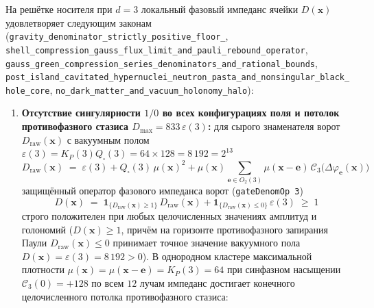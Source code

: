 \begin{theorem}
\label{thm:mono-gravity-pasta-halo}
На решётке носителя при $d = 3$ локальный фазовый импеданс ячейки $D(\mathbf{x})$ удовлетворяет следующим законам (\texttt{gravity\_\allowbreak denominator\_\allowbreak strictly\_\allowbreak positive\_\allowbreak floor\_}, \texttt{shell\_\allowbreak compression\_\allowbreak gauss\_\allowbreak flux\_\allowbreak limit\_\allowbreak and\_\allowbreak pauli\_\allowbreak rebound\_\allowbreak operator}, \texttt{gauss\_\allowbreak green\_\allowbreak compression\_\allowbreak series\_\allowbreak denominators\_\allowbreak and\_\allowbreak rational\_\allowbreak bounds}, \texttt{post\_\allowbreak island\_\allowbreak cavitated\_\allowbreak hypernuclei\_\allowbreak neutron\_\allowbreak pasta\_\allowbreak and\_\allowbreak nonsingular\_\allowbreak black\_\allowbreak hole\_\allowbreak core}, \texttt{no\_\allowbreak dark\_\allowbreak matter\_\allowbreak and\_\allowbreak vacuum\_\allowbreak holonomy\_\allowbreak halo}):
\begin{enumerate}[label=\textbf{(\arabic*)},leftmargin=*]
\item \textbf{Отсутствие сингулярности $1/0$ во всех конфигурациях поля и потолок противофазного стазиса $D_{\max} = 833\,\varepsilon(3)$:}
  для сырого знаменателя ворот $D_{\mathrm{raw}}(\mathbf{x})$ с вакуумным полом $\varepsilon(3) = K_P(3) Q_\square(3) = 64 \times 128 = 8\,192 = 2^{13}$
  \begin{equation}
    \label{eq:mono-gravity-denom-raw}
    D_{\mathrm{raw}}(\mathbf{x}) \;=\; \varepsilon(3) + Q_\square(3)\,\mu(\mathbf{x})^2 + \mu(\mathbf{x}) \sum_{\mathbf{e} \in O_2(3)} \mu(\mathbf{x}-\mathbf{e})\,\mathcal{C}_3\bigl(\Delta\varphi_{\mathbf{e}}(\mathbf{x})\bigr)
  \end{equation}
  защищённый оператор фазового импеданса ворот (\texttt{gateDenomOp 3})
  \begin{equation}
    \label{eq:mono-gravity-denom}
    D(\mathbf{x}) \;=\; \mathbf{1}_{\{D_{\mathrm{raw}}(\mathbf{x}) \ge 1\}}\,D_{\mathrm{raw}}(\mathbf{x}) + \mathbf{1}_{\{D_{\mathrm{raw}}(\mathbf{x}) \le 0\}}\,\varepsilon(3) \;\ge\; 1
  \end{equation}
  строго положителен при любых целочисленных значениях амплитуд и голономий ($D(\mathbf{x}) \ge 1$, причём на горизонте противофазного запирания Паули $D_{\mathrm{raw}}(\mathbf{x}) \le 0$ принимает точное значение вакуумного пола $D(\mathbf{x}) = \varepsilon(3) = 8\,192 > 0$). В однородном кластере максимальной плотности $\mu(\mathbf{x}) = \mu(\mathbf{x}-\mathbf{e}) = K_P(3) = 64$ при синфазном насыщении $\mathcal{C}_3(0) = +128$ по всем $12$ лучам импеданс достигает конечного целочисленного потолка противофазного стазиса:

\end{enumerate}
\end{theorem}
